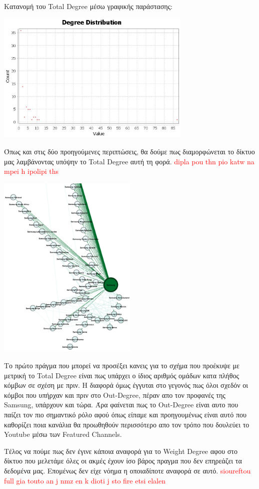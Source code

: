 \documentclass[12pt]{article}
\begin{document}
	\newpage
	Κατανομή του Total Degree μέσω γραφικής παράστασης:
	\begin{center}
		\includegraphics[width=0.7\textwidth]{photos-files/section6/total-degree_graphical.JPG}
	\end{center}
	Όπως και στις δύο προηγούμενες περιπτώσεις, θα δούμε πως διαμορφώνεται το δίκτυο μας λαμβάνοντας υπόψην το Total Degree αυτή τη φορά. \textcolor{red}{dipla pou thn pio katw na mpei h ipolipi ths}
	\begin{center}
		\includegraphics[width=0.5\textwidth]{photos-files/section6/total-degree_RE-layout.png}
	\end{center}
	\par
	Το πρώτο πράγμα που μπορεί να προσέξει κανεις για το σχήμα που προέκυψε με μετρική το Total Degree είναι πως υπάρχει ο ίδιος αριθμός ομάδων κατα πλήθος κόμβων σε σχέση με πριν. Η διαφορά όμως έγγυται στο γεγονός πως όλοι σχεδόν οι κόμβοι που υπήρχαν και πριν στο Out-Degree, πέραν απο τον προφανές της Samsung, υπάρχουν και τώρα. Άρα φαίνεται πως το Out-Degree είναι αυτο που παίζει τον πιο σημαντικό ρόλο αφού όπως είπαμε και προηγουμένως είναι αυτό που καθορίζει ποια κανάλια θα προωθηθούν περισσότερο απο τον τρόπο που δουλεύει το Youtube μέσω των Featured Channels.
	\vspace{12pt}
	\par
	Τέλος να πούμε πως δεν έγινε κάποια αναφορά για το Weight Degree αφου στο δίκτυο που μελετάμε όλες οι ακμές έχουν ίσο βάρος πραγμα που δεν επηρεάζει τα δεδομένα μας. Επομένως δεν είχε νόημα η οποιαδίποτε αναφορά σε αυτό. \textcolor{red}{sioureftou full gia touto an j nmz en k dioti j sto fire etsi elalen}
	\label{chap:degree_measures_6}
	
\end{document}
